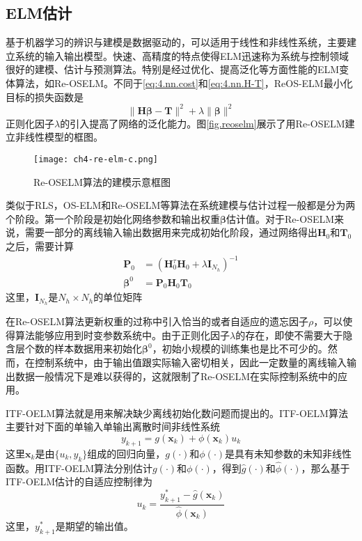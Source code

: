 \subsection{ELM估计}
基于机器学习的辨识与建模是数据驱动的，可以适用于线性和非线性系统，主要建立系统的输入输出模型。快速、高精度的特点使得ELM迅速称为系统与控制领域很好的建模、估计与预测算法。特别是经过优化、提高泛化等方面性能的ELM变体算法，如Re-OSELM。不同于\eqref{eq:4.nn.cost}和\eqref{eq:4.nn.H-T}，ReOS-ELM最小化目标的损失函数是
\begin{equation}\label{eq:4.re.cost}
\|\bm{H}\bm{\beta}-\bm{T}\|^{2}+\lambda\|\bm{\beta}\|^{2}
\end{equation}
正则化因子$\lambda$的引入提高了网络的泛化能力。图\eqref{fig.reoselm}展示了用Re-OSELM建立非线性模型的框图。

\begin{figure}[!htb]
  \centering
  \texttt{[image: ch4-re-elm-c.png]}\\	 %
  \caption{Re-OSELM算法的建模示意框图}
  \label{fig.reoselm}
\end{figure}

类似于RLS，OS-ELM和Re-OSELM等算法在系统建模与估计过程一般都是分为两个阶段。第一个阶段是初始化网络参数和输出权重$\bm{\beta}$估计值。对于Re-OSELM来说，需要一部分的离线输入输出数据用来完成初始化阶段，通过网络得出$\bm{H}_{0}$和$\bm{T}_{0}$之后，需要计算
\begin{equation}
\begin{split}%
\bm{P}_{0}&=(\bm{H}_{0}^{\tau}\bm{H}_{0}+\lambda \bm{I}_{N_{h}})^{-1}\\
\bm{\beta}^{0}&=\bm{P}_{0}\bm{H}_{0}\bm{T}_{0}
\end{split}
\end{equation}
这里，$\bm{I}_{N_{h}}$是$N_{h}\times N_{h}$的单位矩阵

在Re-OSELM算法更新权重的过称中引入恰当的或者自适应的遗忘因子$\rho$，可以使得算法能够应用到时变参数系统中。由于正则化因子$\lambda$的存在，即使不需要大于隐含层个数的样本数据用来初始化$\bm{\beta}^{0}$，初始小规模的训练集也是比不可少的。然而，在控制系统中，由于输出值跟实际输入密切相关，因此一定数量的离线输入输出数据一般情况下是难以获得的，这就限制了Re-OSELM在实际控制系统中的应用。

ITF-OELM算法就是用来解决缺少离线初始化数问题而提出的。ITF-OELM算法主要针对下面的单输入单输出离散时间非线性系统
\begin{equation}\label{eq:4.siso}
y_{k+1} = g(\bm{x}_{k})+\phi(\bm{x}_{k})u_{k}
\end{equation}
这里$\bm{x}_{k}$是由$\{u_{k},y_{k}\}$组成的回归向量，$g(\cdot)$和$\phi(\cdot)$是具有未知参数的未知非线性函数。用ITF-OELM算法分别估计$g(\cdot)$和$\phi(\cdot)$，得到$\hat{g}(\cdot)$和$\hat{\phi}(\cdot)$，那么基于ITF-OELM估计的自适应控制律为
\begin{equation}\label{eq:4.itf.u}
u_{k}=\frac{y_{k+1}^{*}-\hat{g}(\bm{x}_{k})}{\hat{\phi}(\bm{x}_{k})} 
\end{equation}
这里，$y_{k+1}^{*}$是期望的输出值。

